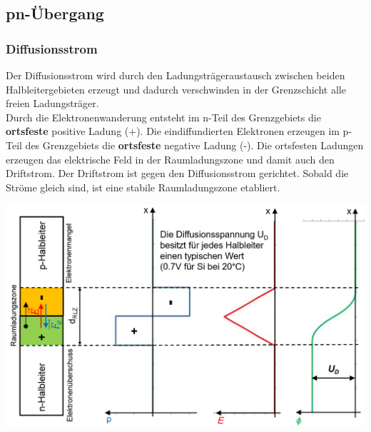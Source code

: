 \begin{multicols}{2}
    \begin{minipage}{\linewidth}
        \vspace{-2cm}
        \subsection{pn-Übergang}
        \subsubsection{Diffusionsstrom}
            Der Diffusionsstrom wird durch den Ladungsträgeraustausch zwischen beiden Halbleitergebieten erzeugt und dadurch verschwinden in der Grenzschicht alle freien Ladungsträger.\\
            Durch die Elektronenwanderung entsteht im n-Teil des Grenzgebiets die \textbf{ortsfeste} positive Ladung (+). Die eindiffundierten Elektronen erzeugen im p-Teil des Grenzgebiets die \textbf{ortsfeste} negative Ladung (-). Die ortsfesten Ladungen erzeugen das elektrische Feld in der Raumladungszone und damit auch den Driftstrom.\newline
            Der Driftstrom ist gegen den Diffusionsstrom gerichtet. Sobald die Ströme gleich sind, ist eine stabile Raumladungszone etabliert.   
    \end{minipage}
    
    \includegraphics[width=0.9\linewidth]{images/pnuebergang}
\end{multicols}

